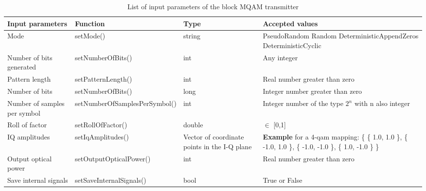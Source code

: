 \begin{table}[h]
\begin{center}
	\begin{tabular}{| m{3cm} | m{6cm} |  m{2cm} | m{} | }
		\hline
		\textbf{Input parameters} & \textbf{Function} & Type & \textbf{Accepted values} \\ \hline
		Mode & setMode() & string & PseudoRandom \newline Random \newline DeterministicAppendZeros \newline DeterministicCyclic \\ \hline
		Number of bits generated & setNumberOfBits() & int & Any integer\\ \hline
		Pattern length & setPatternLength() & int & Real number greater than zero\\ \hline
		Number of bits & setNumberOfBits() & long & Integer number greater than zero\\ \hline
		Number of samples per symbol & setNumberOfSamplesPerSymbol() & int & Integer number of the type $2^n$ with n also integer\\ \hline
		Roll of factor & setRollOfFactor() & double & $\in$ [0,1] \\ \hline
		IQ amplitudes & setIqAmplitudes() & Vector of coordinate points in the I-Q plane & \textbf{Example} for a 4-qam mapping: \{ \{ 1.0, 1.0 \}, \{ -1.0, 1.0 \}, \{ -1.0, -1.0 \}, \{ 1.0, -1.0 \} \} \\ \hline
		Output optical power & setOutputOpticalPower() & int & Real number greater than zero\\ \hline
		Save internal signals & setSaveInternalSignals() & bool & True or False\\
		\hline
	\end{tabular}
	\caption{List of input parameters of the block MQAM transmitter} \label{table}
\end{center}
\end{table}


